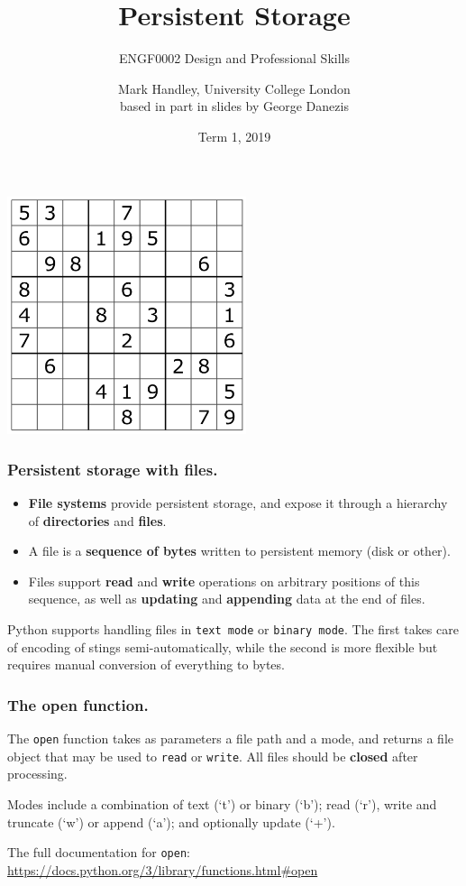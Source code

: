 \documentclass{beamer} %
\author{Mark Handley, University College London\\
{\small based in part in slides by George Danezis}}
\title{Persistent Storage}
\subtitle{ENGF0002 Design and Professional Skills }
\date{Term 1, 2019}
\newcommand\emc[1]{\textcolor{midred}{\textbf{#1}}}
\begin{document}
\nobibliography*


\frame{
\titlepage
}

\begin{frame}
  \centering
  \includegraphics[width=70mm]{assets/sudoku.png}
\end{frame}

\begin{frame}
\frametitle{Persistent storage with files.}

\begin{itemize}
\item \emc{File systems} provide persistent storage, and expose it through a hierarchy of \emc{directories} and \emc{files}.
\item A file is a \emc{sequence of bytes} written to persistent memory (disk or other).
\item Files support \emc{read} and \emc{write} operations on arbitrary positions of this sequence, as well as \emc{updating} and \emc{appending} data at the end of files.
\end{itemize}

Python supports handling files in \texttt{text mode} or \texttt{binary mode}. The first takes care of encoding of stings semi-automatically, while the second is more flexible but requires manual conversion of everything to bytes.

\end{frame}

\begin{frame}
\frametitle{The open function.}

The \texttt{open} function takes as parameters a file path and a mode, and returns a file object that may be used to \texttt{read} or \texttt{write}. All files should be \emc{closed} after processing.

\vspace{3mm}
Modes include a combination of text (`t') or binary (`b'); read (`r'), write and truncate (`w') or append (`a'); and optionally update (`+').

\vspace{3mm}
The full documentation for \texttt{open}: \url{https://docs.python.org/3/library/functions.html\#open}

\end{frame}
\end{document}
